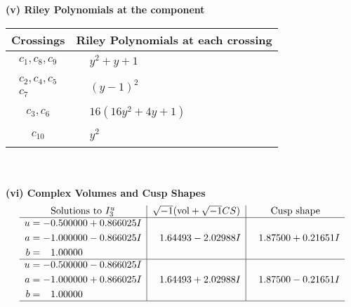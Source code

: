 \documentclass[1p]{elsarticle_modified}
\theoremstyle{definition}
\newcommand{\I}{\sqrt{-1}}
\begin{document}
\flushleft \textbf{(v) Riley Polynomials at the component}\newline \\
\begin{tabular}{m{50pt}|m{274pt}}
Crossings & \hspace{64pt}Riley Polynomials at each crossing \\
\hline $$\begin{aligned}c_{1},c_{8},c_{9}\end{aligned}$$&$\begin{aligned}
&y^2+y+1
\end{aligned}$\\
\hline $$\begin{aligned}c_{2},c_{4},c_{5}\\c_{7}\end{aligned}$$&$\begin{aligned}
&(y-1)^2
\end{aligned}$\\
\hline $$\begin{aligned}c_{3},c_{6}\end{aligned}$$&$\begin{aligned}
&16(16 y^2+4 y+1)
\end{aligned}$\\
\hline $$\begin{aligned}c_{10}\end{aligned}$$&$\begin{aligned}
&y^2
\end{aligned}$\\
\hline
\end{tabular}\\~\\
\newpage\flushleft \textbf{(vi) Complex Volumes and Cusp Shapes}
$$\begin{array}{c|c|c}  
\text{Solutions to }I^u_{3}& \I (\text{vol} + \sqrt{-1}CS) & \text{Cusp shape}\\
 \hline 
\begin{aligned}
u &= -0.500000 + 0.866025 I \\
a &= -1.000000 - 0.866025 I \\
b &= \phantom{-}1.00000\phantom{ +0.000000I}\end{aligned}
 & \phantom{-}1.64493 - 2.02988 I & \phantom{-}1.87500 + 0.21651 I \\ \hline\begin{aligned}
u &= -0.500000 - 0.866025 I \\
a &= -1.000000 + 0.866025 I \\
b &= \phantom{-}1.00000\phantom{ +0.000000I}\end{aligned}
 & \phantom{-}1.64493 + 2.02988 I & \phantom{-}1.87500 - 0.21651 I\\
 \hline 
 \end{array}$$\newpage
\end{document}
